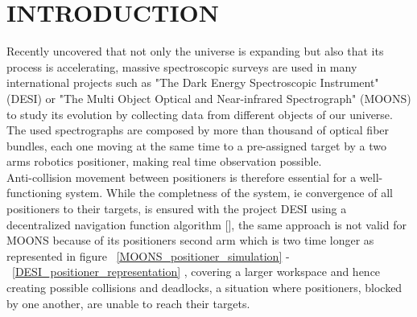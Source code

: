 \documentclass[]{spie}  %
\begin{document}
	
	\section{INTRODUCTION}
	\label{INTRODUCTION}
	Recently uncovered that not only the universe is expanding but also that its process is accelerating, massive spectroscopic surveys are used in many international projects such as  "The Dark Energy Spectroscopic Instrument" (DESI) or  "The Multi Object Optical and Near-infrared Spectrograph" (MOONS) to study its evolution by collecting data from different objects of our universe. The used spectrographs are composed by more than thousand of optical fiber bundles, each one moving at the same time to a pre-assigned target by a two arms robotics positioner, making real time observation possible.\\
	
	Anti-collision movement between positioners is therefore essential for a well-functioning system. While the completness of the system, ie convergence of all positioners to their targets, is ensured with the project DESI using a decentralized navigation function algorithm  [], the same approach is not valid for MOONS because of its positioners second arm which is two time longer as represented in figure ~\ref{MOONS_positioner_simulation} - ~\ref{DESI_positioner_representation} , covering a larger workspace and hence creating possible collisions and deadlocks, a situation where positioners, blocked by one another, are unable to reach their targets.\\
	
\end{document}
